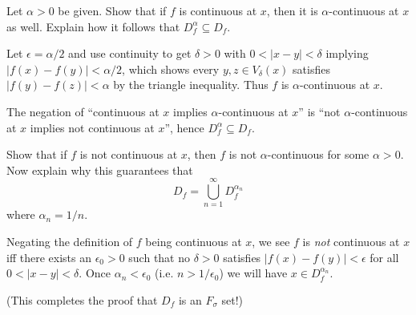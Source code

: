 \begin{exercise}
  Let $\alpha>0$ be given. Show that if $f$ is continuous at $x$, then it is $\alpha$-continuous at $x$ as well. Explain how it follows that $D_{f}^{\alpha} \subseteq D_{f}$.
\end{exercise}
\begin{solution}
  Let $\epsilon = \alpha/2$ and use continuity to get $\delta>0$ with $0<|x-y|<\delta$ implying $|f(x)-f(y)|<\alpha/2$, which shows every $y,z \in V_{\delta}(x)$ satisfies $|f(y)-f(z)| < \alpha$ by the triangle inequality. Thus $f$ is $\alpha$-continuous at $x$.

  The negation of ``continuous at $x$ implies $\alpha$-continuous at $x$'' is ``not $\alpha$-continuous at $x$ implies not continuous at $x$'', hence $D_f^\alpha \subseteq D_f$.
\end{solution}

\begin{exercise}
  Show that if $f$ is not continuous at $x$, then $f$ is not $\alpha$-continuous for some $\alpha>0$. Now explain why this guarantees that
  $$
  D_{f}=\bigcup_{n=1}^{\infty} D_{f}^{\alpha_{n}}
  $$
  where $\alpha_{n}=1 / n$.
\end{exercise}
\begin{solution}
  Negating the definition of $f$ being continuous at $x$, we see $f$ is \emph{not} continuous at $x$ iff there exists an $\epsilon_0 > 0$ such that no $\delta > 0$ satisfies $|f(x)-f(y)|<\epsilon$ for all $0<|x-y|<\delta$. Once $\alpha_n < \epsilon_0$ (i.e. $n > 1/\epsilon_0$) we will have $x \in D_f^{\alpha_n}$.

  (This completes the proof that $D_f$ is an $F_\sigma$ set!)
\end{solution}
